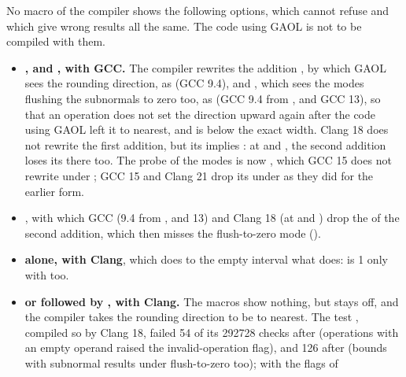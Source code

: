 \documentclass[12pt,a4paper,twoside,openright]{book}
\begin{document}
\medskip
No macro of the compiler shows the following options, which
 cannot refuse and which give wrong results all the
same. The code using GAOL is not to be compiled with them.

\begin{itemize}
\item[$\bullet$] \textbf{, and
  , with GCC.} The compiler
  rewrites the addition , by which GAOL sees the
  rounding direction, as  (GCC 9.4), and
  , which sees the modes flushing the
  subnormals to zero too, as  (GCC 9.4 from
  , and GCC 13), so that an operation does not set the direction
  upward again after the code using GAOL left it to nearest, and
   is below the exact width. Clang 18 does not rewrite the first
  addition, but its  implies
  : at  and , the second
  addition loses its  there too. The probe of the modes is now
  , which GCC 15 does not rewrite
  under ; GCC 15 and Clang 21 drop its
   under  as they did for the earlier
  form.
\item[$\bullet$] \textbf{}, with which GCC (9.4 from
  , and 13) and Clang 18 (at  and ) drop
  the  of the second addition, which then misses the
  flush-to-zero mode ().\newinvfive
\item[$\bullet$] \textbf{ alone, with Clang}, which
  does to the empty interval what  does:
   is 1 only with
   too.
\item[$\bullet$] \textbf{ or  followed by
  , with Clang.} The macros show nothing, but
   stays off, and the compiler takes the rounding
  direction to be to nearest. The test ,
  compiled so by Clang 18, failed 54 of its 292728 checks after
   (operations with an empty operand raised
  the invalid-operation flag), and 126 after 
  (bounds with subnormal results under flush-to-zero too); with the flags of

\end{itemize}
\end{document}
